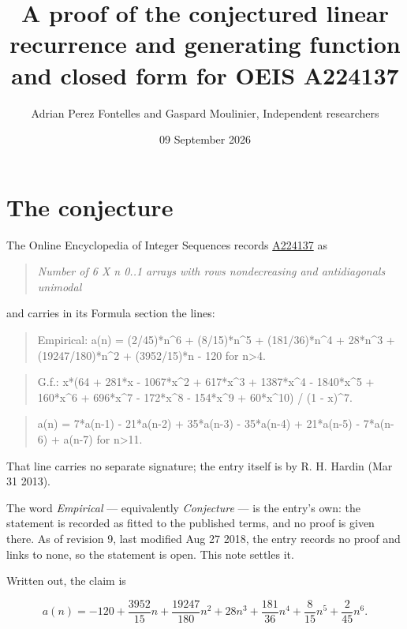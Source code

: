 \documentclass[11pt]{article}
\title{A proof of the conjectured linear recurrence and generating function and closed form for OEIS A224137}
\author{Adrian Perez Fontelles and Gaspard Moulinier, Independent researchers}
\date{09 September 2026}
\theoremstyle{definition}
\begin{document}
\maketitle
\section{The conjecture}

The Online Encyclopedia of Integer Sequences records \href{https://oeis.org/A224137}{A224137} as

\begin{quote}\itshape Number of 6 X n 0..1 arrays with rows nondecreasing and antidiagonals unimodal\end{quote}

and carries in its Formula section the lines:

\begin{quote}\ttfamily Empirical: a(n) = (2/45)*n\textasciicircum{}6 + (8/15)*n\textasciicircum{}5 + (181/36)*n\textasciicircum{}4 + 28*n\textasciicircum{}3 + (19247/180)*n\textasciicircum{}2 + (3952/15)*n - 120 for n>4.\end{quote}

\begin{quote}\ttfamily G.f.: x*(64 + 281*x - 1067*x\textasciicircum{}2 + 617*x\textasciicircum{}3 + 1387*x\textasciicircum{}4 - 1840*x\textasciicircum{}5 + 160*x\textasciicircum{}6 + 696*x\textasciicircum{}7 - 172*x\textasciicircum{}8 - 154*x\textasciicircum{}9 + 60*x\textasciicircum{}10) / (1 - x)\textasciicircum{}7.\end{quote}

\begin{quote}\ttfamily a(n) = 7*a(n-1) - 21*a(n-2) + 35*a(n-3) - 35*a(n-4) + 21*a(n-5) - 7*a(n-6) + a(n-7) for n>11.\end{quote}

That line carries no separate signature; the entry itself is by R. H. Hardin (Mar 31 2013).

The word {\itshape Empirical} --- equivalently {\itshape Conjecture} --- is the entry's own: the statement is recorded as fitted to the published terms, and no proof is given there. As of revision 9, last modified Aug 27 2018, the entry records no proof and links to none, so the statement is open. This note settles it.

Written out, the claim is

\[a(n) = -120 + \frac{3952}{15}n + \frac{19247}{180}n^{2} + 28n^{3} + \frac{181}{36}n^{4} + \frac{8}{15}n^{5} + \frac{2}{45}n^{6}.\]
\end{document}
